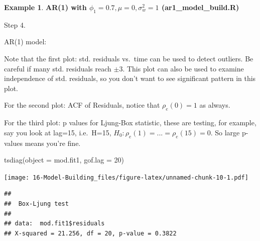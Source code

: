 \documentclass[
]{book}
\newenvironment{Shaded}{\begin{snugshade}}{\end{snugshade}}
\newcommand{\AttributeTok}[1]{\textcolor[rgb]{0.77,0.63,0.00}{#1}}
\newcommand{\CommentTok}[1]{\textcolor[rgb]{0.56,0.35,0.01}{\textit{#1}}}
\newcommand{\DecValTok}[1]{\textcolor[rgb]{0.00,0.00,0.81}{#1}}
\newcommand{\FunctionTok}[1]{\textcolor[rgb]{0.00,0.00,0.00}{#1}}
\newcommand{\NormalTok}[1]{#1}
\newcommand{\SpecialCharTok}[1]{\textcolor[rgb]{0.00,0.00,0.00}{#1}}
\newcommand{\StringTok}[1]{\textcolor[rgb]{0.31,0.60,0.02}{#1}}
\theoremstyle{definition}
\theoremstyle{definition}
\newtheorem{example}{Example}[chapter]
\theoremstyle{definition}
\theoremstyle{definition}
\theoremstyle{remark}
\begin{document}
\begin{example}
\textbf{AR(1) with \(\phi_1=0.7, \mu=0, \sigma_w^2=1\) (ar1\_model\_build.R)}

Step 4.

AR(1) model:

Note that the first plot: std. residuals vs.~time can be used to detect outliers. Be careful if many std. residuals reach \(\pm 3\).
This plot can also be used to examine independence of std. residuals, so you don't want to see significant pattern in this plot.

For the second plot: ACF of Residuals, notice that \(\rho_e(0)=1\) as always.

For the third plot: p values for Ljung-Box statistic, these are testing, for example, say you look at lag=15, i.e.~H=15, \(H_0: \rho_e(1)=...=\rho_e(15)=0\). So large p-values means you're fine.

\begin{Shaded}
\begin{Highlighting}[]
\FunctionTok{tsdiag}\NormalTok{(}\AttributeTok{object =}\NormalTok{ mod.fit1, }\AttributeTok{gof.lag =} \DecValTok{20}\NormalTok{)}
\end{Highlighting}
\end{Shaded}

\texttt{[image: 16-Model-Building\_files/figure-latex/unnamed-chunk-10-1.pdf]}

\begin{Shaded}
\end{Shaded}

\begin{verbatim}
## 
##  Box-Ljung test
## 
## data:  mod.fit1$residuals
## X-squared = 21.256, df = 20, p-value = 0.3822
\end{verbatim}

\begin{Shaded}
\end{Shaded}


\end{example}
\end{document}
